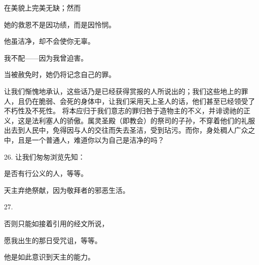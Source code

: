  \par

 \par

 在美貌上完美无缺；然而\par

 她的救恩不是因功绩，而是因怜悯。\par

 他虽洁净，却不会使你无辜。\par

 我不配——因为我曾迫害。\par

 当被赦免时，她仍将记念自己的罪。\par

让我们惭愧地承认，这些话乃是已经获得赏报的人所说出的；我们这些地上的罪人，且仍在脆弱、会死的身体中，让我们采用天上圣人的话，他们甚至已经领受了不朽性及不死性。  将本应归于我们意志的罪归咎于造物主的不义，并诽谤祂的正义，这是法利塞人的骄傲。属灵圣殿（即教会）的祭司的子孙，不穿着他们的礼服出去到人民中，免得因与人的交往而失去圣洁，受到玷污。而你，身处稠人广众之中，且是一个普通人，难道你以为自己是洁净的吗？\par

26. 让我们匆匆浏览先知：\par

 是否有行公义的人，等等。\par

 天主弃绝祭献，因为敬拜者的邪恶生活。\par

 \par

27.\par

 否则只能如接着引用的经文所说，\par

 愿我出生的那日受咒诅，等等。\par

 他是如此意识到天主的能力。\par

